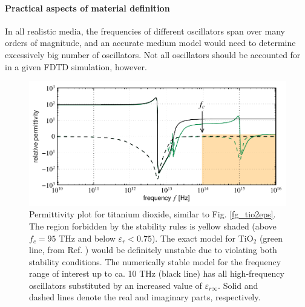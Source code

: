 \paragraph{Practical aspects of material definition} %
In all realistic media, the frequencies of different oscillators span over many orders of magnitude, and an accurate medium model would need to determine excessively big number of oscillators. Not all oscillators should be accounted for in a given FDTD simulation, however. 

\begin{figure}[t] \caption{Permittivity plot for titanium dioxide, similar to Fig. \ref{fg_tio2eps}. 
The region forbidden by the stability rules is yellow shaded (above $f_c = 95$ THz and below $\varepsilon_r < 0.75$). The exact model for TiO$_{2}$ (green line, from Ref. \cite{dominec2014_meep_metamaterials}) would be definitely unstable due to violating both stability conditions. The numerically stable model for the frequency range of interest up to ca. 10 THz (black line) has all high-frequency oscillators substituted by an increased value of $\varepsilon_{r\infty}$. Solid and dashed lines denote the real and imaginary parts, respectively. } \label{fg_tio2eps_stripped} \centering 
	\includegraphics[width=14cm]{img/epsilon_TiO2stripped_symlog.pdf}
\end{figure}


